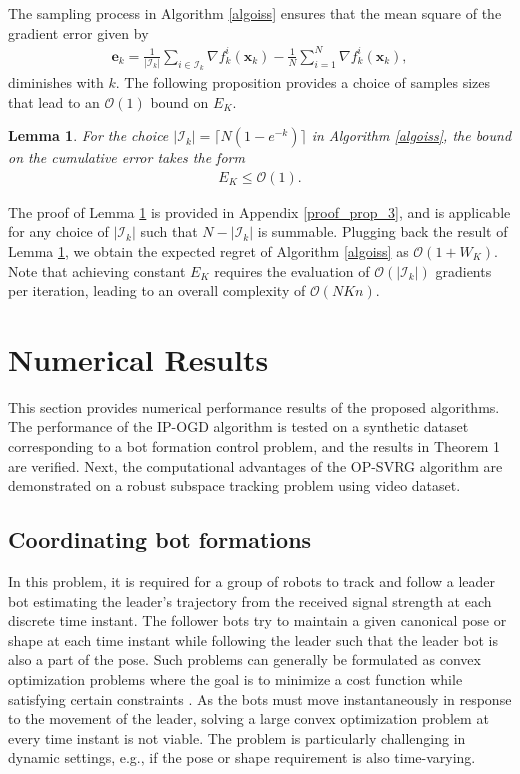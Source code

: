 \documentclass[draftcls,onecolumn,12pt]{IEEEtran}
\theoremstyle{plain}
\newtheorem{lem}{Lemma}
\def\x{\mathbf{x}}
\def\e{\mathbf{e}}
\def\I{\mathcal{I}}
\providecommand{\abs}[1]{\left|#1\right|}
\theoremstyle{plain}
\theoremstyle{remark}
\begin{document}
The sampling process in Algorithm \ref{algoiss} ensures that the mean square of the gradient error given by 
 \begin{align}
  \e_k=\frac{1}{\abs{\I_k}}\sum\limits_{i \in \I_k}\nabla f_k^i(\x_k)- \frac{1}{N}\sum\limits_{i=1}^{N}\nabla f_k^{i}(\x_k), \label{error_incresing}
  \end{align} 
diminishes with $k$. The following proposition provides a choice of samples sizes that lead to an $\mathcal{O}(1)$ bound on $E_K$. 
	
 \begin{lem}\label{lemiss}
For the choice $\abs{\I_k} = \lceil N(1-e^{-k}) \rceil$ in Algorithm \ref{algoiss}, the bound on the cumulative error takes the form 
\begin{align}
E_K \leq \mathcal{O}(1).
\end{align} 
 \end{lem}

The proof of Lemma \ref{lemiss} is provided in Appendix \ref{proof_prop_3}, and is applicable for any choice of $\abs{\I_k}$ such that $N-\abs{\I_k}$ is summable. Plugging back the result of Lemma \ref{lemiss}, we obtain the expected regret of Algorithm \ref{algoiss} as $\mathcal{O}(1+W_K)$. Note that achieving constant $E_K$ requires the evaluation of $\mathcal{O}(\abs{\I_k})$ gradients per iteration, leading to an overall complexity of $\mathcal{O}(NKn)$. 


\section{Numerical Results}
This section provides numerical performance results of the proposed algorithms. The performance of the IP-OGD algorithm is tested on a synthetic dataset corresponding to a bot formation control problem, and the results in Theorem 1 are verified. Next, the computational advantages of the OP-SVRG algorithm are demonstrated on a robust subspace tracking problem using video dataset. 

\subsection{Coordinating bot formations}
In this problem, it is required for a group of robots to track and follow a leader bot estimating the leader's trajectory from the received signal strength at each discrete time instant. The follower bots try to maintain a given canonical pose or shape at each time instant while following the leader such that the leader bot is also a part of the pose. Such problems can generally be formulated as convex optimization problems where the goal is to minimize a cost function while satisfying certain constraints \cite{derenick2007convex}. As the bots must move instantaneously in response to the movement of the leader, solving a large convex optimization problem at every time instant is not viable. The problem is particularly challenging in dynamic settings, e.g., if the pose or shape requirement is also time-varying. 
\end{document}

